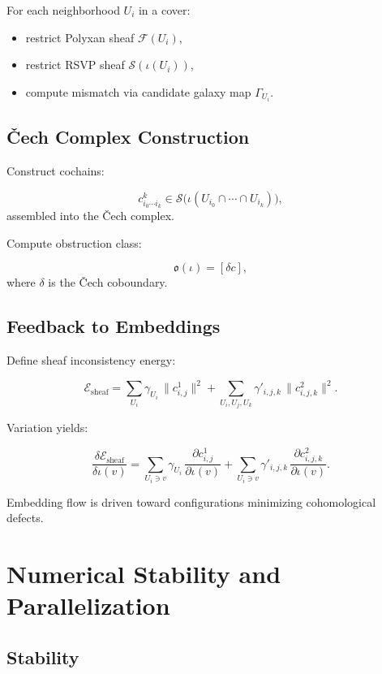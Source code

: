 For each neighborhood $U_i$ in a cover:

\begin{itemize}
  \item restrict Polyxan sheaf $\mathcal{F}(U_i)$,
  \item restrict RSVP sheaf $\mathscr{S}(\iota(U_i))$,
  \item compute mismatch via candidate galaxy map $\Gamma_{U_i}$.
\end{itemize}

\subsection{Čech Complex Construction}

Construct cochains:

\[
  c^k_{i_0\cdots i_k}
  \in \mathscr{S}\big(\iota(U_{i_0}\cap\cdots\cap U_{i_k})\big),
\]
assembled into the Čech complex.

Compute obstruction class:

\[
  \mathfrak{o}(\iota)
  =
  [\delta c],
\]
where $\delta$ is the Čech coboundary.

\subsection{Feedback to Embeddings}

Define sheaf inconsistency energy:

\[
  \mathcal{E}_{\mathrm{sheaf}}
  =
  \sum_{U_i}
    \gamma_{U_i}\,
    \|c^1_{i,j}\|^2
  + \sum_{U_i,U_j,U_k}
    \gamma'_{i,j,k}\,
    \|c^2_{i,j,k}\|^2.
\]

Variation yields:

\[
  \frac{\delta\mathcal{E}_{\mathrm{sheaf}}}{\delta\iota(v)}
  =
  \sum_{U_i\ni v}
    \gamma_{U_i}\,
    \frac{\partial c^{1}_{i,j}}{\partial \iota(v)}
  +
  \sum_{U_i\ni v}
    \gamma'_{i,j,k}\,
    \frac{\partial c^{2}_{i,j,k}}{\partial \iota(v)}.
\]

Embedding flow is driven toward configurations minimizing cohomological defects.


\section{Numerical Stability and Parallelization}

\subsection{Stability}

